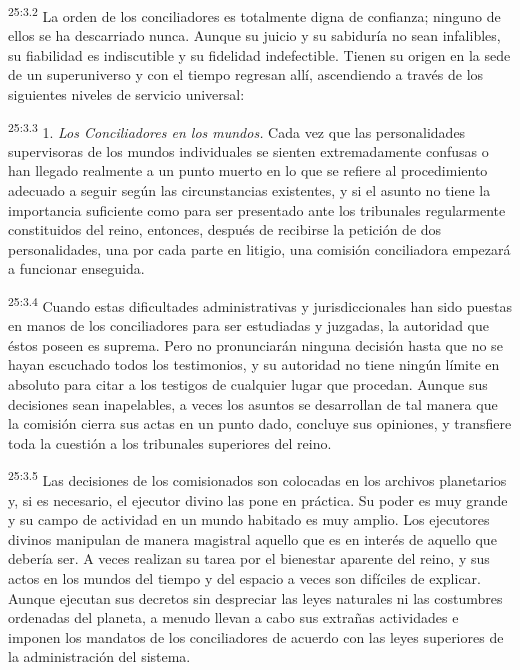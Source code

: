 \par
\textsuperscript{25:3.2} La orden de los conciliadores es totalmente digna de confianza; ninguno de ellos se ha descarriado nunca. Aunque su juicio y su sabiduría no sean infalibles, su fiabilidad es indiscutible y su fidelidad indefectible. Tienen su origen en la sede de un superuniverso y con el tiempo regresan allí, ascendiendo a través de los siguientes niveles de servicio universal:

\par
\textsuperscript{25:3.3} 1. \textit{Los Conciliadores en los mundos.} Cada vez que las personalidades supervisoras de los mundos individuales se sienten extremadamente confusas o han llegado realmente a un punto muerto en lo que se refiere al procedimiento adecuado a seguir según las circunstancias existentes, y si el asunto no tiene la importancia suficiente como para ser presentado ante los tribunales regularmente constituidos del reino, entonces, después de recibirse la petición de dos personalidades, una por cada parte en litigio, una comisión conciliadora empezará a funcionar enseguida.

\par
\textsuperscript{25:3.4} Cuando estas dificultades administrativas y jurisdiccionales han sido puestas en manos de los conciliadores para ser estudiadas y juzgadas, la autoridad que éstos poseen es suprema. Pero no pronunciarán ninguna decisión hasta que no se hayan escuchado todos los testimonios, y su autoridad no tiene ningún límite en absoluto para citar a los testigos de cualquier lugar que procedan. Aunque sus decisiones sean inapelables, a veces los asuntos se desarrollan de tal manera que la comisión cierra sus actas en un punto dado, concluye sus opiniones, y transfiere toda la cuestión a los tribunales superiores del reino.

\par
\textsuperscript{25:3.5} Las decisiones de los comisionados son colocadas en los archivos planetarios y, si es necesario, el ejecutor divino las pone en práctica. Su poder es muy grande y su campo de actividad en un mundo habitado es muy amplio. Los ejecutores divinos manipulan de manera magistral aquello que es en interés de aquello que debería ser. A veces realizan su tarea por el bienestar aparente del reino, y sus actos en los mundos del tiempo y del espacio a veces son difíciles de explicar. Aunque ejecutan sus decretos sin despreciar las leyes naturales ni las costumbres ordenadas del planeta, a menudo llevan a cabo sus extrañas actividades e imponen los mandatos de los conciliadores de acuerdo con las leyes superiores de la administración del sistema.

